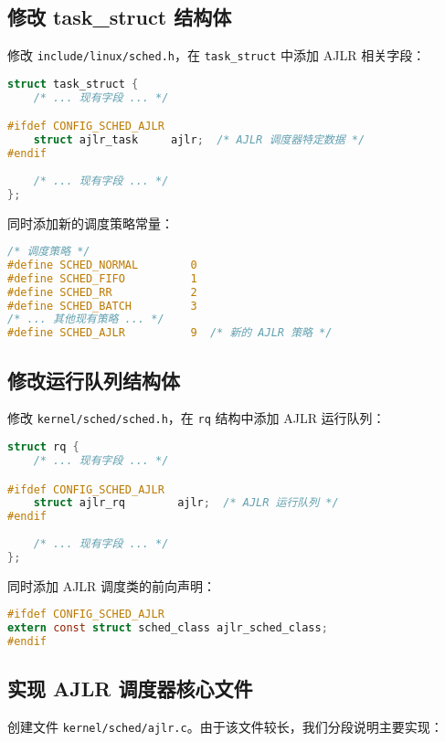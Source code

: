 \documentclass[a4paper,12pt]{article}
\begin{document}
\subsection{修改 task\_struct 结构体}

修改 \texttt{include/linux/sched.h}，在 \texttt{task\_struct} 中添加 AJLR 相关字段：

\begin{lstlisting}[language=C]
struct task_struct {
    /* ... 现有字段 ... */

#ifdef CONFIG_SCHED_AJLR
    struct ajlr_task     ajlr;  /* AJLR 调度器特定数据 */
#endif
    
    /* ... 现有字段 ... */
};
\end{lstlisting}

同时添加新的调度策略常量：

\begin{lstlisting}[language=C]
/* 调度策略 */
#define SCHED_NORMAL        0
#define SCHED_FIFO          1
#define SCHED_RR            2
#define SCHED_BATCH         3
/* ... 其他现有策略 ... */
#define SCHED_AJLR          9  /* 新的 AJLR 策略 */
\end{lstlisting}

\subsection{修改运行队列结构体}

修改 \texttt{kernel/sched/sched.h}，在 \texttt{rq} 结构中添加 AJLR 运行队列：

\begin{lstlisting}[language=C]
struct rq {
    /* ... 现有字段 ... */

#ifdef CONFIG_SCHED_AJLR
    struct ajlr_rq        ajlr;  /* AJLR 运行队列 */
#endif
    
    /* ... 现有字段 ... */
};
\end{lstlisting}

同时添加 AJLR 调度类的前向声明：

\begin{lstlisting}[language=C]
#ifdef CONFIG_SCHED_AJLR
extern const struct sched_class ajlr_sched_class;
#endif
\end{lstlisting}

\subsection{实现 AJLR 调度器核心文件}

创建文件 \texttt{kernel/sched/ajlr.c}。由于该文件较长，我们分段说明主要实现：
\end{document}
